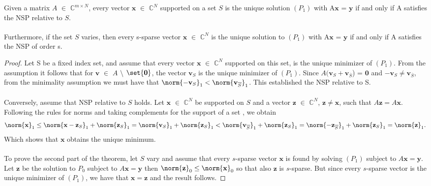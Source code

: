 \begin{tcolorbox}[colback=yellow,colframe=white]
\begin{theorem}
Given a matrix $A$ $\in$ $\mathbb{C}^{m \times N}$, every vector  $\mathbf{x}$ $\in$ $\mathbb{C}^{N}$ supported on a set $S$ is the unique solution $(P_1)$ with A$\mathbf{x}$ = $\mathbf{y}$ if and only if A satisfies the NSP relative to $S$. \\ \\
Furthermore, if the set $S$ varies, then every s-sparse vector $\mathbf{x}$ $\in$ $\mathbb{C}^{N}$ is the unique solution to $(P_1)$ with A$\mathbf{x}$ = $\mathbf{y}$ if and only if A satisfies the NSP of order s.
\end{theorem}
\end{tcolorbox}

\begin{proof}

Let S be a fixed index set, and assume that every vector  $\mathbf{x}$ $\in$ $\mathbb{C}^{N}$ supported on this set, is the unique minimizer of $(P_1)$. From the assumption it follows that for  $\mathbf{v}$ $\in$  $A$ $\setminus$ $\set{\mathbf{0}}$, the vector $\mathbf{v}_{S}$ is the unique minimizer of $(P_1)$. Since $A(\mathbf{v}_{S}+\mathbf{v}_{\overline{S}}$) = $\mathbf{0}$ and $\mathbf{-v}_{S} \neq \mathbf{v}_{\overline{S}}$, from the minimality assumption we must have that $\norm{ \mathbf{-v}_{S}}_{1}  <  \norm{ \mathbf{v}_{\overline{S}}}_{1}$. This established the NSP relative to S.
\\ \\
Conversely, assume that NSP relative to $S$ holds. Let $\mathbf{x}$ $\in$ $\mathbb{C}^{N}$ be supported on  $S$ and a vector $\mathbf{z}$ $\in$ $\mathbb{C}^{N}$, $\mathbf{z} \neq \mathbf{x}$, such that $A\mathbf{z} = A\mathbf{x}$. Following the rules for norms and taking complements for the support of a set , we obtain
\begin{equation*}
\norm{ \mathbf{x}}_{1} \leq \norm{ \mathbf{x} - \mathbf{z}_{S}}_{1} +  \norm{\mathbf{z}_{S}}_{1} =\norm{\mathbf{v}_{S}}_{1}  + \norm{\mathbf{z}_{S}}_{1}  <  \norm{ \mathbf{v}_{\overline{S}}}_{1} + \norm{\mathbf{z}_{S}}_{1} = \norm{ \mathbf{-z}_{\overline{S}}}_{1} + \norm{\mathbf{z}_{S}}_{1} = \norm{\mathbf{z}}_{1}.
\end{equation*}
Which shows that $\mathbf{x}$ obtains the unique minimum.
\\ \\
To prove the second part of the theorem, let $S$ vary and assume that every $s$-sparse vector  $\mathbf{x}$ is found by solving $(P_1)$ subject to $A\mathbf{x} = \mathbf{y}$. Let $\mathbf{z}$ be the solution to $P_0$ subject to  $A\mathbf{x} = \mathbf{y}$ then $\norm{\mathbf{z}}_{0} \leq \norm{\mathbf{x}}_{0}$ so that also $\mathbf{z}$ is $s$-sparse. But since every $s$-sparse vector is the unique minimizer of $(P_1)$, we have that $\mathbf{x} = \mathbf{z}$ and the result follows.
\end{proof}


